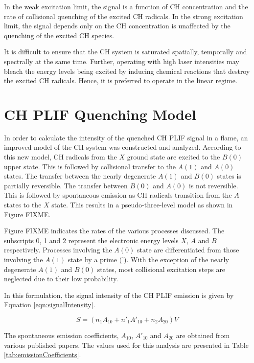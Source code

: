In the weak excitation limit, the signal is a function of CH concentration and the rate of collisional quenching of the excited CH radicals.
In the strong excitation limit, the signal depends only on the CH concentration is unaffected by the quenching of the excited CH species.

It is difficult to ensure that the CH system is saturated spatially, temporally and spectrally at the same time.
Further, operating with high laser intensities may bleach the energy levels being excited by inducing chemical reactions that destroy the excited CH radicals.
Hence, it is preferred to operate in the linear regime.

\section{CH PLIF Quenching Model}
\label{sec:quenchingmodel}


In order to calculate the intensity of the quenched CH PLIF signal in a flame, an improved model of the CH system was constructed and analyzed.
According to this new model, CH radicals from the \(X\) ground state are excited to the \(B(0)\) upper state.
This is followed by collisional transfer to the \(A(1)\) and \(A(0)\) states.
The transfer between the nearly degenerate \(A(1)\) and \(B(0)\) states is partially reversible.
The transfer between \(B(0)\) and \(A(0)\) is not reversible.
This is followed by spontaneous emission as CH radicals transition from the \(A\) states to the \(X\) state.
This results in a pseudo-three-level model as shown in Figure FIXME.

Figure FIXME indicates the rates of the various processes discussed.
The subscripts 0, 1 and 2 represent the electronic energy levels \(X\), \(A\) and \(B\) respectively.
Processes involving the \(A(0)\) state are differentiated from those involving the \(A(1)\) state by a prime (').
With the exception of the nearly degenerate \(A(1)\) and \(B(0)\) states, most collisional excitation steps are neglected due to their low probability.

In this formulation, the signal intensity of the CH PLIF emission is given by Equation \ref{eqn:signalIntensity}.

\begin{equation}
S = ( n_1A_{10} + n'_1A'_{10} + n_2A_{20} )V
\label{eqn:signalIntensity}
\end{equation}

The spontaneous emission coefficients, \(A_{10}\), \(A'_{10}\) and \(A_{20}\) are obtained from various published papers\cite{1985-garland-a,1996-luque-b,2005-richmond}.
The values used for this analysis are presented in Table \ref{tab:emissionCoefficients}.

